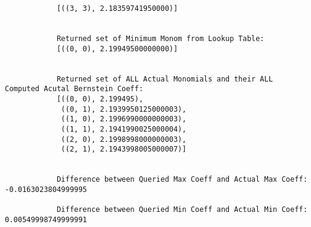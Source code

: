 \begin{verbatim}
            [((3, 3), 2.18359741950000)]


            Returned set of Minimum Monom from Lookup Table:
            [((0, 0), 2.19949500000000)]


            Returned set of ALL Actual Monomials and their ALL Computed Acutal Bernstein Coeff:
            [((0, 0), 2.199495),
             ((0, 1), 2.1939950125000003),
             ((1, 0), 2.1996990000000003),
             ((1, 1), 2.1941990025000004),
             ((2, 0), 2.1998998000000003),
             ((2, 1), 2.1943998005000007)]


            Difference between Queried Max Coeff and Actual Max Coeff: -0.0163023804999995

            Difference between Queried Min Coeff and Actual Min Coeff: 0.00549998749999991
  \end{verbatim}    
